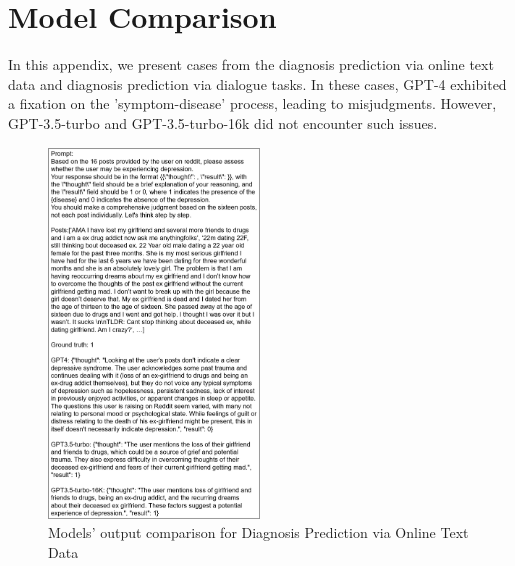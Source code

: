 \section{Model Comparison}
\label{app: model comparison}
In this appendix, we present cases from the diagnosis prediction via online text data and diagnosis prediction via dialogue tasks. In these cases, GPT-4 exhibited a fixation on the 'symptom-disease' process, leading to misjudgments. However, GPT-3.5-turbo and GPT-3.5-turbo-16k did not encounter such issues.
\begin{figure}[htpb]
    \centering
    \includegraphics[width=0.5\textwidth]{Figure/SMHD_example1.png}
    \caption{Models' output comparison for Diagnosis Prediction via Online Text Data}
\end{figure}

